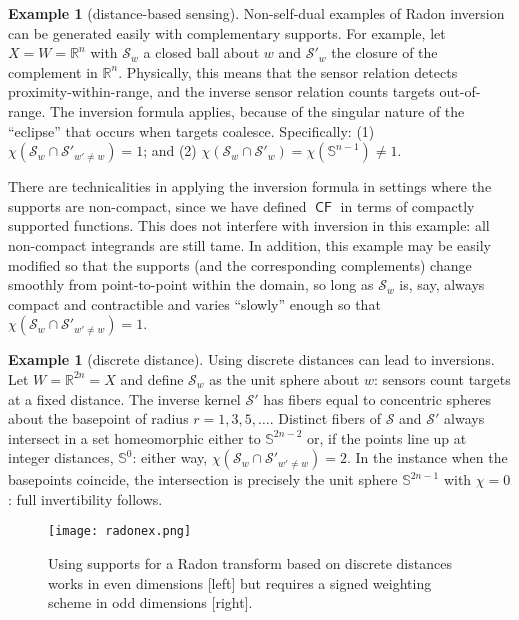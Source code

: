 \documentclass{psapm-l}
\theoremstyle{definition}
\newtheorem{example}[theorem]{Example}
\theoremstyle{remark}
\numberwithin{equation}{section}
\begin{document}
\begin{example}[distance-based sensing]
\label{ex:invradoncomplements}
Non-self-dual examples of Radon inversion can be generated easily with complementary supports. For example, let $X=W={{\mathbb R}}^n$ with ${{\mathcal S}}_w$ a closed ball about $w$ and ${{\mathcal S}}'_w$ the closure of the complement in ${{\mathbb R}}^n$. Physically, this means that the sensor relation detects proximity-within-range, and the inverse sensor relation counts targets out-of-range. The inversion formula applies, because of the singular nature of the ``eclipse'' that occurs when targets coalesce. Specifically: (1) $\chi({{\mathcal S}}_w\cap{{\mathcal S}}'_{w'\neq w})=1$; and (2) $\chi({{\mathcal S}}_w\cap{{\mathcal S}}'_{w})=\chi({{\mathbb S}}^{n-1})\neq 1$.

There are technicalities in applying the inversion formula in settings where the supports are non-compact, since we have defined ${{{\operatorname{\mathsf{{CF}}}}}}$ in terms of compactly supported functions. This does not interfere with inversion in this example: all non-compact integrands are still tame. In addition, this example may be easily modified so that the supports (and the corresponding complements) change smoothly from point-to-point within the domain, so long as ${{\mathcal S}}_w$ is, say, always compact and contractible and varies ``slowly'' enough so that $\chi({{\mathcal S}}_w\cap{{\mathcal S}}'_{w'\neq w})=1$.
\end{example}

\begin{example}[discrete distance]
\label{ex:invradonbessel}
Using discrete distances can lead to inversions. Let $W={{\mathbb R}}^{2n}=X$ and define  ${{\mathcal S}}_w$ as the unit sphere about $w$: sensors count targets at a fixed distance. The inverse kernel ${{\mathcal S}}'$ has fibers equal to concentric spheres about the basepoint of radius $r=1,3,5,\ldots$. Distinct fibers of ${{\mathcal S}}$ and ${{\mathcal S}}'$ always intersect in a set homeomorphic either to ${{\mathbb S}}^{2n-2}$ or, if the points line up at integer distances, ${{\mathbb S}}^0$: either way, $\chi({{\mathcal S}}_w\cap{{\mathcal S}}'_{w'\neq w})=2$. In the instance when the basepoints coincide, the intersection is precisely the unit sphere ${{\mathbb S}}^{2n-1}$ with $\chi=0$: full invertibility follows.
\begin{figure}[hbt]
\begin{center}
\texttt{[image: radonex.png]}
\caption{Using supports for a Radon transform based on discrete distances works in even dimensions [left] but requires a signed weighting scheme in odd dimensions [right].}
\label{fig:radonex}
\end{center}
\end{figure}
\end{example}
\end{document}

